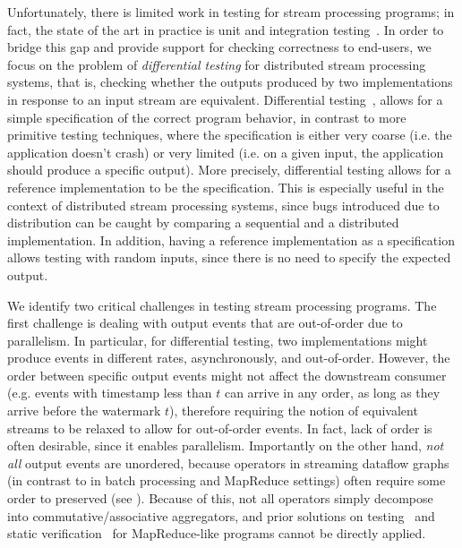 Unfortunately, there is limited work in testing for stream processing programs; in fact, the state of the art in practice is unit and integration testing~\cite{vianna2019exploratory}.
In order to bridge this gap and provide support for checking correctness to end-users,
we focus on the problem of \emph{differential  testing} for distributed stream processing systems, that is, checking whether the outputs produced by two implementations in response to an input stream are equivalent.
Differential testing~\cite{mckeeman1998differential,groce2007randomized,evans2007differential},
allows for a simple specification of the correct program behavior, in contrast to more primitive testing techniques, where
the specification is either very coarse (i.e. the application doesn't crash) or very limited (i.e. on a given input, the application should produce a specific output).
More precisely, differential testing allows for a reference implementation to be the specification. This is especially useful in the context of distributed stream processing systems, since bugs introduced due to distribution can be caught by comparing a sequential and a distributed implementation. In addition, having a reference implementation as a specification allows testing with random inputs, since there is no need to specify the expected output.

We identify two critical challenges in testing stream processing programs.
The first challenge is dealing with output events that are out-of-order due to parallelism. In particular, for differential testing,
two implementations might produce events in different rates, asynchronously, and out-of-order.
However, the order between specific output events might not affect the downstream consumer (e.g. events with timestamp less than $t$ can arrive in any order, as long as they arrive before the watermark $t$),
therefore requiring the notion of equivalent streams to be relaxed to allow for out-of-order events.
In fact, lack of order is often desirable, since it enables parallelism.
Importantly on the other hand, \emph{not all} output events are unordered, because operators in streaming dataflow graphs (in contrast to in batch processing and MapReduce settings) often require some order to preserved (see ).
Because of this, not all operators simply decompose into commutative/associative aggregators, and prior solutions on testing~\cite{csallner2011new,xu2013semantic,marynowski2012testing,chen2016commutativity} and static verification~\cite{liu2014automating,raychev2015parallelizing} for MapReduce-like programs cannot be directly applied.

